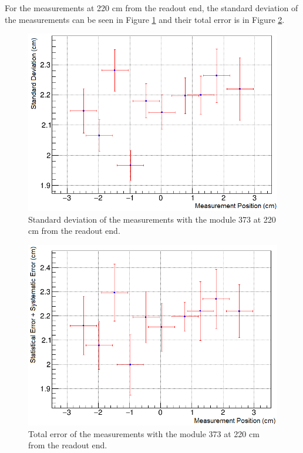 \documentclass[a4paper]{article}\linespread{1.4}
\begin{document}
For the measurements at 220 cm from the readout end, the standard deviation of the measurements can be seen in Figure \ref{fig:73fs} and their total error is in Figure \ref{fig:73fe}.
\begin{figure}[h!] \hspace*{-0cm} \includegraphics[width=120mm,scale=2.0]{73fs.png} \caption{Standard deviation of the measurements with the module 373 at 220 cm from the readout end.}  \label{fig:73fs}\end{figure}
\begin{figure}[h!] \hspace*{-0cm} \includegraphics[width=120mm,scale=2.0]{73fe.png} \caption{Total error of the measurements with the module 373 at 220 cm from the readout end.}  \label{fig:73fe}\end{figure}
\end{document}
